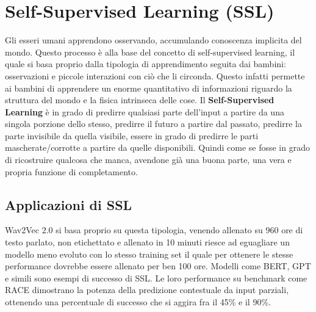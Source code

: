 \section{Self-Supervised Learning (SSL)}

Gli esseri umani apprendono osservando, accumulando conoscenza implicita del mondo. Questo processo è alla base del concetto di self-supervised learning, il quale si basa proprio dalla tipologia di apprendimento seguita dai bambini: osservazioni e piccole interazioni con ciò che li circonda. Questo infatti permette ai bambini di apprendere un enorme quantitativo di informazioni riguardo la struttura del mondo e la fisica intrinseca delle cose. Il \textbf{Self-Supervised Learning} è in grado di predirre qualsiasi parte dell'input a partire da una singola porzione dello stesso, predirre il futuro a partire dal passato, predirre la parte invisibile da quella visibile, essere in grado di predirre le parti mascherate/corrotte a partire da quelle disponibili. Quindi come se fosse in grado di ricostruire qualcosa che manca, avendone già una buona parte, una vera e propria funzione di completamento.

\subsection{Applicazioni di SSL}
Wav2Vec 2.0 si basa proprio su questa tipologia, venendo allenato su 960 ore di testo parlato, non etichettato e allenato in 10 minuti riesce ad eguagliare un modello meno evoluto con lo stesso training set il quale per ottenere le stesse performance dovrebbe essere allenato per ben 100 ore. Modelli come BERT, GPT e simili sono esempi di successo di SSL. Le loro performance su benchmark come RACE dimostrano la potenza della predizione contestuale da input parziali, ottenendo una percentuale di successo che si aggira fra il 45\% e il 90\%.

